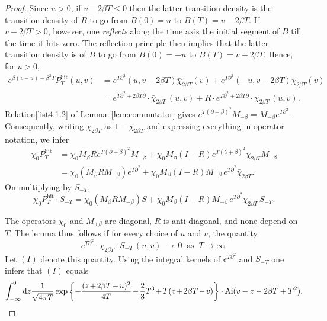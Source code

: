 \documentclass[10pt]{amsart}
\theoremstyle{definition}\newtheorem{defi}[theo]{Definition}\newtheorem{rema}[theo]{Remark}\newtheorem{exam}[theo]{Example}\newtheorem{exem}[theo]{Example}\newtheorem{nota}[theo]{Notation}
\newcommand*{\dd}{\mathrm{d}}
\DeclareMathOperator{\hit}{hit}
\DeclareMathOperator{\Ai}{Ai}
\newcommand*{\Mk}{\mkern -2mu}
\begin{document}
\begin{proof}
Since $u > 0$, if $v - 2\beta T \leq 0$ then the latter transition density is the transition density of $B$ to go from $B(0) = u$ to $B(T) = v - 2\beta T$. If $v - 2\beta T > 0$, however, one \emph{reflects} along the time axis the initial segment of $B$ till the time it hits zero. The reflection principle then implies that the latter transition density is of $B$ to go from $B(0) = -u$ to $B(T) = v-2\beta T$. Hence, for $u > 0$,
\begin{align*}
e^{\beta(v-u)-\beta^2T} P^{\hit}_T(u,v) &= e^{T \partial^2}(u, v - 2\beta T) \bar{\chi}_{2\beta T}(v)+e^{T\partial^2}(-u, v-2\beta T) \chi_{2\beta T}(v) \\
& = e^{T\partial^2 + 2\beta T\partial} \cdot \bar{\chi}_{2\beta T}\,(u,v) +R \cdot e^{T\partial^2 + 2\beta T\partial} \cdot \chi_{2\beta T}\,(u,v).
\end{align*}
Relation\eqref{list4.1.2} of Lemma~\ref{lem:commutator} gives $e^{T(\partial + \beta)^2}M_{-\beta} = M_{-\beta}e^{T\partial^2}$. Consequently, writing $\chi_{2\beta T}$ as $1- \bar{\chi}_{2\beta T}$ and expressing everything in operator notation, we infer
\begin{align*}
\chi_0 P^{\hit}_T &= \chi_0 M_{\beta} R e^{T(\partial+\beta)^2}M_{-\beta}+\chi_0 M_{\beta}(I-R)e^{T(\partial+\beta)^2} \chi_{2\beta T} M_{-\beta} \\
&= \chi_0 (M_{\beta}RM_{-\beta})e^{T \partial^2}+\chi_0 M_{\beta}(I-R)M_{-\beta}\,e^{T\partial^2}\bar{\chi}_{2\beta T}.
\end{align*}
On multiplying by $S_{-T}$,
\[
\chi_0 P^{\hit}_T \cdot S_{-T} = \chi_0 (M_{\beta}RM_{-\beta})S +
\chi_0 M_{\beta}(I-R)M_{-\beta}\,e^{T\partial^2}\bar{\chi}_{2\beta T} \, S_{-T}.
\]

The operators $\chi_0$ and $M_{\pm \beta}$ are diagonal, $R$ is anti-diagonal, and none depend on $T$. The lemma thus follows if for every choice of $u$ and $v$, the quantity
\[
e^{T\partial^2} \cdot \bar{\chi}_{2\beta T} \cdot S_{-T}\,(u,v) \; \to\, 0 \;\;\text{as}\;\; T \to \infty.
\]
Let $(I)$ denote this quantity. Using the integral kernels of $e^{T\partial^2}$ and $S_{-T}$ one infers that $(I)$ equals
\[
\int_{-\infty}^0 \dd z \frac{1}{\sqrt{4 \pi T}} \exp \left \{-\frac{(z\Mk+\Mk 2\beta T \Mk-\Mk u)^2}{4T} \Mk-\Mk \frac{2}{3}T^3 \Mk+\Mk T(z\Mk+\Mk 2 \beta T\Mk-\Mk v) \right\} \cdot \Ai(v-z-2\beta T + T^2).
\]


\end{proof}
\end{document}
